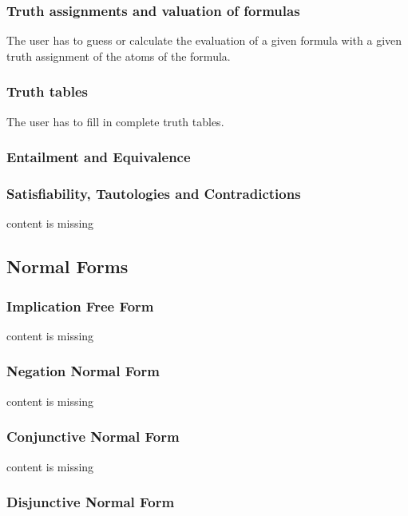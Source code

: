 \subsubsection{Truth assignments and valuation of formulas}

The user has to guess or calculate the evaluation of a given formula with a given truth assignment of the atoms of the formula.

\subsubsection{Truth tables}

The user has to fill in complete truth tables.

\subsubsection{Entailment and Equivalence}



\subsubsection{Satisfiability, Tautologies and Contradictions}

content is missing

\subsection{Normal Forms}

\subsubsection{Implication Free Form}

content is missing

\subsubsection{Negation Normal Form}

content is missing

\subsubsection{Conjunctive Normal Form}

content is missing

\subsubsection{Disjunctive Normal Form}

